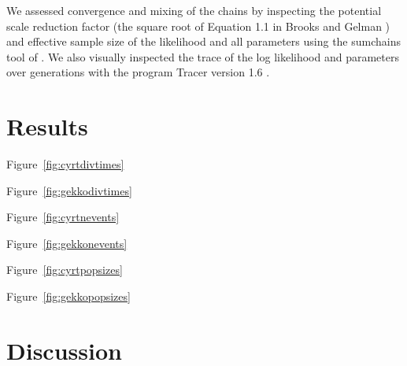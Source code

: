 We assessed convergence and mixing of the chains by inspecting the potential scale
reduction factor (the square root of Equation 1.1 in Brooks and Gelman
\citeyear{Brooks1998}) and effective sample size \citep{Gong2014} of the
likelihood and all parameters using the sumchains tool of \pycoevolity.
We also visually inspected the trace of the log likelihood and parameters over
generations with the program Tracer version 1.6 \citep{Tracer16}.


\section{Results}

Figure~\ref{fig:cyrtdivtimes}

Figure~\ref{fig:gekkodivtimes}

Figure~\ref{fig:cyrtnevents}

Figure~\ref{fig:gekkonevents}

Figure~\ref{fig:cyrtpopsizes}

Figure~\ref{fig:gekkopopsizes}

\section{Discussion}
